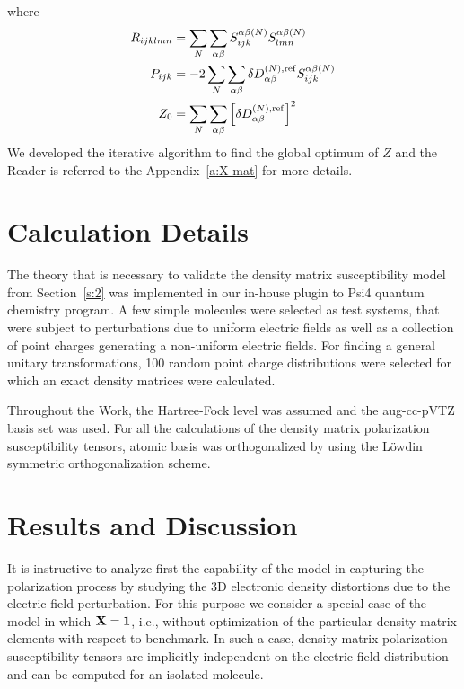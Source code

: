 \documentclass[aip,graphicx]{revtex4-1}
\begin{document}
%
where 
%
\begin{subequations}
 \begin{align}
  R_{ijklmn} &=  \sum_N \sum_{\alpha\beta} S_{ijk}^{\alpha\beta(N)} S_{lmn}^{\alpha\beta(N)} \\
  P_{ijk}    &=-2\sum_N \sum_{\alpha\beta} \delta D_{\alpha\beta}^{(N),{\rm ref}} S_{ijk}^{\alpha\beta(N)} \\
  Z_0        &=  \sum_N \sum_{\alpha\beta} \left[ \delta D_{\alpha\beta}^{(N),{\rm ref}} \right]^2
 \end{align}
\end{subequations}
%
We developed the iterative algorithm to find the global optimum of $Z$ and the Reader 
is referred to the Appendix~\ref{a:X-mat} for more details. 

\section{\label{s:3}Calculation Details}

The theory that is necessary to validate the density matrix susceptibility model from Section~\ref{s:2}
was implemented in our in\hyp{}house plugin to Psi4 quantum chemistry program.
A few simple molecules were selected as test systems, that were subject to 
perturbations due to uniform electric fields as well as a collection of point charges
generating a non\hyp{}uniform electric fields. For finding a general unitary transformations,
100 random point charge distributions were selected for which an exact density matrices
were calculated.

Throughout the Work, the Hartree\hyp{}Fock level was assumed and the aug-cc-pVTZ basis set
was used. For all the calculations of the density matrix polarization susceptibility tensors, 
atomic basis was orthogonalized by using the L{\"o}wdin symmetric orthogonalization scheme.


\section{\label{s:4}Results and Discussion}


It is instructive to analyze first the capability of the model in capturing the polarization
process by studying the 3D electronic density distortions due to the electric field perturbation.
For this purpose we consider a special case of the model in which ${\bf X}={\bf 1}$, i.e., without
optimization of the particular density matrix elements with respect to benchmark. In such a case,
density matrix polarization susceptibility tensors are implicitly independent on the electric field
distribution and can be computed for an isolated molecule.
\end{document}
